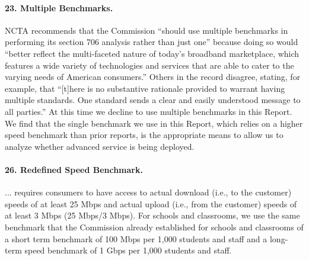 

\paragraph{23. Multiple Benchmarks. } NCTA recommends that the Commission ``should use
multiple benchmarks
in performing its section 706 analysis rather than just one'' because doing so would ``better
reflect the multi-faceted nature of today’s broadband marketplace, which features a wide
variety of technologies and services that are able to cater to the varying needs of American
consumers.'' Others in the record disagree, stating, for example, that ``[t]here is
no substantive rationale provided to warrant having multiple standards. One standard sends
a clear and easily understood message to all parties.'' At this time we decline to use multiple 
benchmarks in this Report. We find that the single benchmark we use in this Report, which
relies on a higher speed benchmark than prior reports, is the appropriate means to allow us
to analyze whether advanced service is being deployed.

\paragraph{26. Redefined Speed Benchmark. } ... requires consumers to have access to actual
download (i.e., to the customer) speeds of at least 25 Mbps and actual upload (i.e., from 
the customer) speeds of at least 3 Mbps (25 Mbps/3 Mbps). For schools and classrooms, we use
the same benchmark that the Commission already established for schools and classrooms of a 
short term benchmark of 100 Mbps per 1,000 students and staff and a long-term speed 
benchmark of 1 Gbps per 1,000 students and staff.

